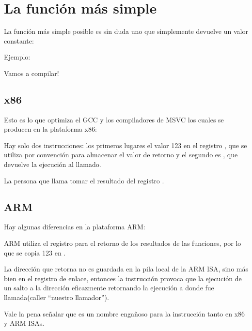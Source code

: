 \section{La función más simple}

La función más simple posible es sin duda uno que simplemente devuelve un valor constante:

Ejemplo:



Vamos a compilar!

\subsection{x86}

Esto es lo que optimiza el GCC  y los compiladores de MSVC los cuales se producen en la plataforma x86:



Hay solo dos instrucciones: los primeros lugares el valor 123 en el registro \EAX, que se utiliza por convención para almacenar el valor de retorno y el segundo es \RET, que devuelve la ejecución al llamado.

La persona que llama tomar el resultado del registro \EAX.

\subsection{ARM}

Hay algunas diferencias en la plataforma ARM:



ARM utiliza el registro  para el retorno de los resultados de las funciones, por lo que se copia 123 en .

La dirección que retorna no es guardada en la pila local de la ARM \ac{ISA}, sino más bien en el registro de enlace,
entonces la instrucción  provoca que la ejecución de un salto a la dirección eficazmente retornando la ejecución a donde fue llamada(caller ``nuestro llamador'').

Vale la pena señalar que \MOV es un nombre engañoso para la instrucción tanto en x86 y ARM \ac{ISA}s.

